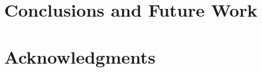 \documentclass{article}
\begin{document}








\section{Conclusions and Future Work}\label{sec:conc}


\section*{Acknowledgments}


{
  \small
  \balance
  
  
}
\end{document}
